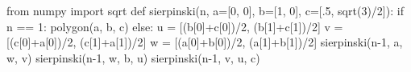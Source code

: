 \documentclass[10pt,fleqn]{book} %
\begin{document}
\begin{multicols}{2}
\begin{corrige}
\begin{python}
from numpy import sqrt
def sierpinski(n, a=[0, 0], b=[1, 0], c=[.5, sqrt(3)/2]):
    if n == 1:
        polygon(a, b, c)
    else:
        u = [(b[0]+c[0])/2, (b[1]+c[1])/2]
        v = [(c[0]+a[0])/2, (c[1]+a[1])/2]
        w = [(a[0]+b[0])/2, (a[1]+b[1])/2]
        sierpinski(n-1, a, w, v)
        sierpinski(n-1, w, b, u)
        sierpinski(n-1, v, u, c)
\end{python}
\end{corrige}
\else
\fi



\ifprof
\else
\end{multicols}
\fi


\end{document}
